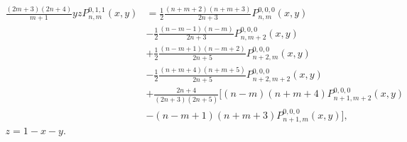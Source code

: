 \documentclass[a4paper,12pt]{article}
\newcommand{\ppoly}[3]{P_{#1,#2}^{#3}}
\begin{document}
\begin{align}
  \label{equ:pnm011}
  \frac{(2m+3)(2n+4)}{m+1}yz\ppoly{n}{m}{0,1,1}(x,y)
  &=
  \frac{1}{2}\frac{(n+m+2)(n+m+3)}{2n+3}\ppoly{n}{m}{0,0,0}(x,y)\nonumber\\
  &-
  \frac{1}{2}\frac{(n-m-1)(n-m)}{2n+3}\ppoly{n}{m+2}{0,0,0}(x,y)\nonumber\\
  &+
  \frac{1}{2}\frac{(n-m+1)(n-m+2)}{2n+5}\ppoly{n+2}{m}{0,0,0}(x,y)\nonumber\\
  &-
  \frac{1}{2}\frac{(n+m+4)(n+m+5)}{2n+5}\ppoly{n+2}{m+2}{0,0,0}(x,y)\nonumber\\
  &+
  \frac{2n+4}{(2n+3)(2n+5)}
  \biggl[
    (n-m)(n+m+4)\ppoly{n+1}{m+2}{0,0,0}(x,y)\nonumber\\
    &-
    (n-m+1)(n+m+3)\ppoly{n+1}{m}{0,0,0}(x,y)  
    \biggr],\\
    z = 1 - x - y.\nonumber
\end{align}
\end{document}
